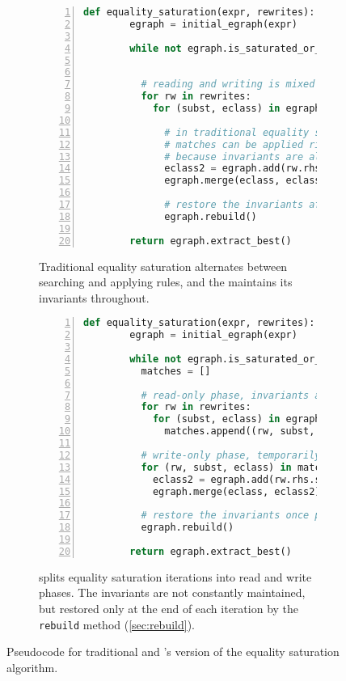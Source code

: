 \begin{figure}
  \begin{subfigure}[t]{0.47\linewidth}
    \begin{lstlisting}[language=Python, gobble=6, numbers=left, basicstyle=\scriptsize\ttfamily, xleftmargin=13pt, numbersep=7pt]
      def equality_saturation(expr, rewrites):
        egraph = initial_egraph(expr)

        while not egraph.is_saturated_or_timeout():


          # reading and writing is mixed
          for rw in rewrites:
            for (subst, eclass) in egraph.ematch(rw.lhs):

              # in traditional equality saturation,
              # matches can be applied right away
              # because invariants are always maintained
              eclass2 = egraph.add(rw.rhs.subst(subst))
              egraph.merge(eclass, eclass2)

              # restore the invariants after each merge
              egraph.rebuild()

        return egraph.extract_best()
    \end{lstlisting}
    \caption{
      Traditional equality saturation alternates between searching and applying
      rules, and the \egraph maintains its invariants throughout.
    }
    \label{fig:eq-sat-code1}
  \end{subfigure}
  \hfill
  \begin{subfigure}[t]{0.47\linewidth}
    \begin{lstlisting}[language=Python, gobble=6, basicstyle=\scriptsize\ttfamily, numbers=left, numbersep=5pt]
      def equality_saturation(expr, rewrites):
        egraph = initial_egraph(expr)

        while not egraph.is_saturated_or_timeout():
          matches = []

          # read-only phase, invariants are preserved
          for rw in rewrites:
            for (subst, eclass) in egraph.ematch(rw.lhs):
              matches.append((rw, subst, eclass))

          # write-only phase, temporarily break invariants
          for (rw, subst, eclass) in matches:
            eclass2 = egraph.add(rw.rhs.subst(subst))
            egraph.merge(eclass, eclass2)

          # restore the invariants once per iteration
          egraph.rebuild()

        return egraph.extract_best()
    \end{lstlisting}
    \caption{
      \egg splits equality saturation iterations into read and write phases.
      The \egraph invariants are not constantly maintained, but restored
      only at the end of each iteration by the \texttt{rebuild} method
      (\autoref{sec:rebuild}).
    }
    \label{fig:eq-sat-code2}
  \end{subfigure}

  \caption{
    Pseudocode for traditional and \egg's version of the equality saturation
    algorithm.
  }
  \label{fig:eq-sat-code}
\end{figure}


